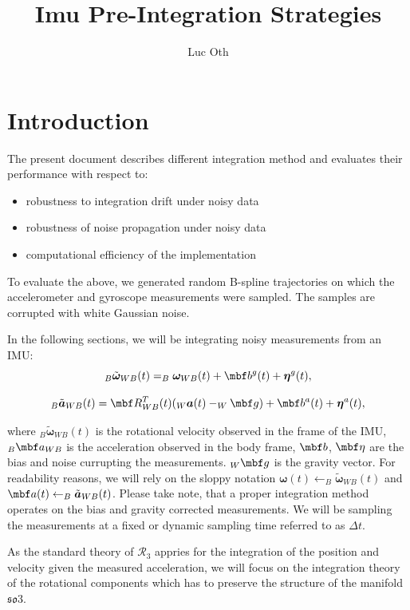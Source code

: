 \documentclass[10pt,a4paper]{article}
\author{Luc Oth}
\title{Imu Pre-Integration Strategies}
\newcommand{\mbs}[1]{{\boldsymbol{#1}}}
\numberwithin{equation}{section}
\begin{document}
\maketitle

\section{Introduction}
The present document describes different integration method and evaluates their performance with respect to:
\begin{itemize}
\item robustness to integration drift under noisy data
\item robustness of noise propagation under noisy data
\item computational efficiency of the implementation
\end{itemize}

To evaluate the above, we generated random B-spline trajectories on which the accelerometer and gyroscope measurements were sampled. The samples are corrupted with white Gaussian noise.

In the following sections, we will be integrating noisy measurements from an IMU:
\begin{equation}
 _B \tilde { \mbs \omega}_{WB}(t) =  _B \mbs \omega_{WB}(t) + \mbf b^g(t) + \mbs \eta^g(t),
\end{equation}

\begin{equation}
 _B \tilde { \mbs a}_{WB}(t) =  \mbf R_{WB}^T(t)  (_W \mbs a(t) - _W\mbf g )+ \mbf b^a(t) + \mbs \eta^a(t),
\end{equation}

where $_B \tilde{\mbs \omega}_{WB}(t)$ is the rotational velocity observed in the frame of the IMU, $_B \mbf  a_{WB}$ is the acceleration observed in the body frame, $\mbf b$, $\mbf \eta$ are the bias and noise currupting the measurements. $_W \mbf  g$ is the gravity vector. For readability reasons, we will rely on the sloppy notation $\mbs \omega(t) \leftarrow _B \tilde { \mbs \omega}_{WB}(t)$ and $\mbf a(t) \leftarrow _B \tilde { \mbs a}_{WB}(t)$. Please take note, that a proper integration method operates on the bias and gravity corrected measurements.
We will be sampling the measurements at a fixed or dynamic sampling time referred to as $\Delta t$.

As the standard theory of $\mathcal{R}_3$ appries for the integration of the position and velocity given the measured acceleration, we will focus on the integration theory of the rotational components which has to preserve the structure of the manifold $\mathfrak{so}3$.
\end{document}
